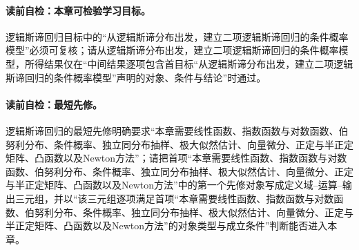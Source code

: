 
\label{struct:V2-C05-CH01}
\paragraph{读前自检：本章可检验学习目标。}逻辑斯谛回归目标中的“从逻辑斯谛分布出发，建立二项逻辑斯谛回归的条件概率模型”必须可复核；请从逻辑斯谛分布出发，建立二项逻辑斯谛回归的条件概率模型，所得结果仅在“中间结果逐项包含首目标“从逻辑斯谛分布出发，建立二项逻辑斯谛回归的条件概率模型”声明的对象、条件与结论”时通过。\par


\label{struct:V2-C05-CH02}
\paragraph{读前自检：最短先修。}逻辑斯谛回归的最短先修明确要求“本章需要线性函数、指数函数与对数函数、伯努利分布、条件概率、独立同分布抽样、极大似然估计、向量微分、正定与半正定矩阵、凸函数以及Newton方法”；请把首项“本章需要线性函数、指数函数与对数函数、伯努利分布、条件概率、独立同分布抽样、极大似然估计、向量微分、正定与半正定矩阵、凸函数以及Newton方法”中的第一个先修对象写成定义域--运算--输出三元组，并以“该三元组逐项满足首项“本章需要线性函数、指数函数与对数函数、伯努利分布、条件概率、独立同分布抽样、极大似然估计、向量微分、正定与半正定矩阵、凸函数以及Newton方法”的对象类型与成立条件”判断能否进入本章。\par

